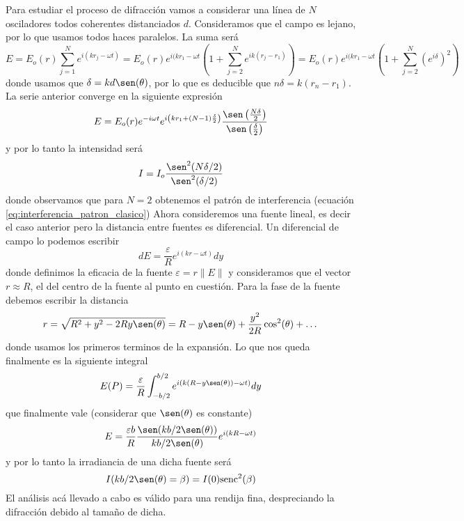 \documentclass[a4paper]{article}
\numberwithin{equation}{section}
\begin{document}
	Para estudiar el proceso de difracción vamos a considerar una línea de $N$ osciladores todos coherentes distanciados $d$. Consideramos que el campo es lejano, por lo que usamos todos haces paralelos. La suma será
	\[E = E_o(r) \sum_{j = 1}^{N} e^{i(k r_j - \omega t)} = E_o(r) e^{i(k r_1 - \omega t} \left(1 + \sum_{j = 2}^N e^{i k (r_j - r_1)}\right) = E_o(r) e^{i(k r_1 - \omega t} \left(1 + \sum_{j = 2}^N \left(e^{i \delta}\right)^2\right)\] donde usamos que $\delta = k d \sen(\theta)$, por lo que es deducible que $n \delta = k(r_n - r_1)$. La serie anterior converge en la siguiente expresión \[E = E_o(r)e^{-i \omega t} e^{i \left(k r_1 + (N -1)\frac{\delta}{2}\right)}\frac{\sen\left(\frac{N \delta}{2}\right)}{\sen\left(\frac{\delta}{2}\right)}\] y por lo tanto la intensidad será \[I = I_o \frac{\sen^2(N\delta/2)}{\sen^2(\delta/2)}\] donde observamos que para $N = 2$ obtenemos el patrón de interferencia (ecuación \ref{eq:interferencia_patron_clasico})
	Ahora consideremos una fuente lineal, es decir el caso anterior pero la distancia entre fuentes es diferencial. Un diferencial de campo lo podemos escribir \[dE = \frac{\varepsilon}{R} e^{i(k r - \omega t)} dy\] donde definimos la eficacia de la fuente $\varepsilon = r \|E\|$ y consideramos que el vector $r \approx R$, el del centro de la fuente al punto en cuestión. Para la fase de la fuente debemos escribir la distancia \[r = \sqrt{R^2 + y^2 - 2 R y \sen(\theta)} = R - y\sen(\theta) + \frac{y^2}{2R} \cos^2(\theta) + \dots\] donde usamos los primeros terminos de la expansión. Lo que nos queda finalmente es la siguiente integral \[ E(P) = \frac{\varepsilon}{R} \int_{-b/2}^{b/2} e^{i(k (R - y\sen(\theta)) - \omega t)} dy\] que finalmente vale (considerar que $\sen(\theta)$ es constante)
	\begin{equation}
		E = \frac{\varepsilon b}{R} \frac{\sen(k b / 2 \sen(\theta))}{k b / 2 \sen(\theta)} e^{i (k R - \omega t)}
		\label{eq:difraccion_campo_ranura}
	\end{equation}
	y por lo tanto la irradiancia de una dicha fuente será
	\begin{equation}
		I(k b / 2 \sen(\theta) = \beta) = I(0) \text{senc}^2(\beta)
		\label{eq:difraccion_ranura}
	\end{equation}
	El análisis acá llevado a cabo es válido para una rendija fina, despreciando la difracción debido al tamaño de dicha. 
	
\end{document}
